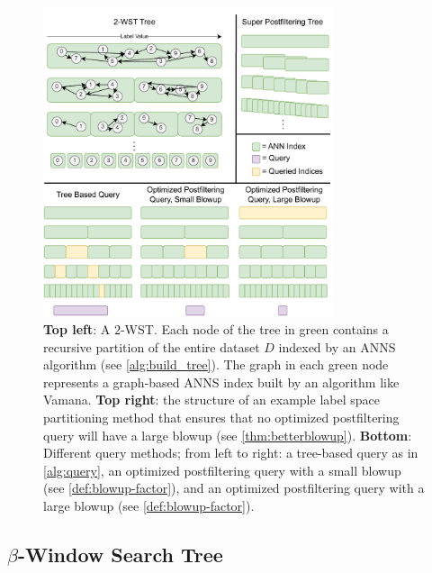 \documentclass{article}
\theoremstyle{plain}
\theoremstyle{definition}
\theoremstyle{remark}
\newcommand{\laxman}[1]{{\color{teal}{\bf Laxman:} #1}}
\begin{document}
\begin{figure}[t]
\centering
\centerline{\includegraphics[width=8.5cm]{images/wst.drawio.pdf}}
\vspace{0.15cm}
\caption{\textbf{Top left}: A $2$-WST. Each node of the tree in green contains a recursive partition of the entire dataset $D$ indexed by an ANNS algorithm (see \cref{alg:build_tree}). The graph in each green node represents a graph-based ANNS index built by an algorithm like Vamana. \textbf{Top right}: the structure of an example label space partitioning method that ensures that no optimized postfiltering query will have a large blowup (see \cref{thm:betterblowup}). \textbf{Bottom}: Different query methods; from left to right: a tree-based query as in \cref{alg:query}, an optimized postfiltering query with a small blowup (see \cref{def:blowup-factor}), and an optimized postfiltering query with a large blowup (see \cref{def:blowup-factor}). 
}
\label{fig:algorithm}
\end{figure}

\subsection{$\beta$-Window Search Tree}
\label{sec:beta_wst}


\end{document}
